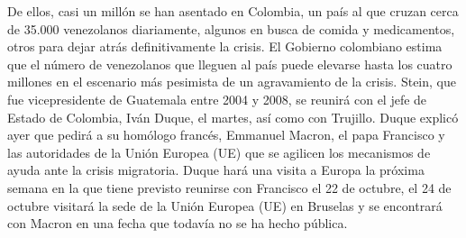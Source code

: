\documentclass{article}%
\begin{document}
%
De ellos, casi un millón se han asentado en Colombia, un país al que cruzan cerca de 35.000 venezolanos diariamente, algunos en busca de comida y medicamentos, otros para dejar atrás definitivamente la crisis.%
\newline%
%
El Gobierno colombiano estima que el número de venezolanos que lleguen al país puede elevarse hasta los cuatro millones en el escenario más pesimista de un agravamiento de la crisis.%
\newline%
%
Stein, que fue vicepresidente de Guatemala entre 2004 y 2008, se reunirá con el jefe de Estado de Colombia, Iván Duque, el martes, así como con Trujillo.%
\newline%
%
Duque explicó ayer que pedirá a su homólogo francés, Emmanuel Macron, el papa Francisco y las autoridades de la Unión Europea (UE) que se agilicen los mecanismos de ayuda ante la crisis migratoria.%
\newline%
%
Duque hará una visita a Europa la próxima semana en la que tiene previsto reunirse con Francisco el 22 de octubre, el 24 de octubre visitará la sede de la Unión Europea (UE) en Bruselas y se encontrará con Macron en una fecha que todavía no se ha hecho pública.%
\newline%
%
\end{document}
